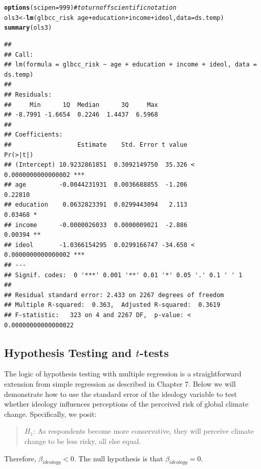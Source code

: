 \documentclass[11pt,openany]{book}\usepackage[]{graphicx}\usepackage[]{color}
\makeatletter
\newcommand{\hlnum}[1]{\textcolor[rgb]{0.686,0.059,0.569}{#1}}%
\newcommand{\hlcom}[1]{\textcolor[rgb]{0.678,0.584,0.686}{\textit{#1}}}%
\newcommand{\hlopt}[1]{\textcolor[rgb]{0,0,0}{#1}}%
\newcommand{\hlstd}[1]{\textcolor[rgb]{0.345,0.345,0.345}{#1}}%
\newcommand{\hlkwb}[1]{\textcolor[rgb]{0.69,0.353,0.396}{#1}}%
\newcommand{\hlkwc}[1]{\textcolor[rgb]{0.333,0.667,0.333}{#1}}%
\newcommand{\hlkwd}[1]{\textcolor[rgb]{0.737,0.353,0.396}{\textbf{#1}}}%
\newenvironment{kframe}{%
 \def\at@end@of@kframe{}%
 \ifinner\ifhmode%
  \def\at@end@of@kframe{\end{minipage}}%
  \begin{minipage}{\columnwidth}%
 \fi\fi%
 \def\FrameCommand##1{\hskip\@totalleftmargin \hskip-\fboxsep
 \colorbox{shadecolor}{##1}\hskip-\fboxsep
     \hskip-\linewidth \hskip-\@totalleftmargin \hskip\columnwidth}%
 \MakeFramed {\advance\hsize-\width
   \@totalleftmargin\z@ \linewidth\hsize
   \@setminipage}}%
 {\par\unskip\endMakeFramed%
 \at@end@of@kframe}
\newenvironment{knitrout}{}{} %
\renewenvironment{knitrout}{\begin{singlespace}}{\end{singlespace}} %
\makeatother
\begin{document}
\begin{knitrout}
\color{fgcolor}\begin{kframe}
\begin{alltt}
\hlkwd{options}\hlstd{(}\hlkwc{scipen} \hlstd{=} \hlnum{999}\hlstd{)}  \hlcom{#to turn off scientific notation}
\hlstd{ols3} \hlkwb{<-} \hlkwd{lm}\hlstd{(glbcc_risk} \hlopt{~} \hlstd{age} \hlopt{+} \hlstd{education} \hlopt{+} \hlstd{income} \hlopt{+} \hlstd{ideol,} \hlkwc{data} \hlstd{= ds.temp)}
\hlkwd{summary}\hlstd{(ols3)}
\end{alltt}
\begin{verbatim}
## 
## Call:
## lm(formula = glbcc_risk ~ age + education + income + ideol, data = ds.temp)
## 
## Residuals:
##     Min      1Q  Median      3Q     Max 
## -8.7991 -1.6654  0.2246  1.4437  6.5968 
## 
## Coefficients:
##                  Estimate    Std. Error t value             Pr(>|t|)    
## (Intercept) 10.9232861851  0.3092149750  35.326 < 0.0000000000000002 ***
## age         -0.0044231931  0.0036688855  -1.206              0.22810    
## education    0.0632823391  0.0299443094   2.113              0.03468 *  
## income      -0.0000026033  0.0000009021  -2.886              0.00394 ** 
## ideol       -1.0366154295  0.0299166747 -34.650 < 0.0000000000000002 ***
## ---
## Signif. codes:  0 '***' 0.001 '**' 0.01 '*' 0.05 '.' 0.1 ' ' 1
## 
## Residual standard error: 2.433 on 2267 degrees of freedom
## Multiple R-squared:  0.363,	Adjusted R-squared:  0.3619 
## F-statistic:   323 on 4 and 2267 DF,  p-value: < 0.00000000000000022
\end{verbatim}
\end{kframe}
\end{knitrout}

\subsection{Hypothesis Testing and $t$-tests}

The logic of hypothesis testing with multiple regression is a straightforward extension from  simple regression as described in Chapter 7. Below we will demonstrate how to use the standard error of the ideology variable to test whether ideology influences perceptions of the perceived risk of global climate change. Specifically, we posit:
\begin{quote}
{$H_1$}: As respondents become more conservative, they will perceive climate change to be less risky, all else equal. 
\end{quote}
Therefore, $\beta_{ideology} < 0$. The null
hypothesis is that $\beta_{ideology} = 0$. 
\end{document}
